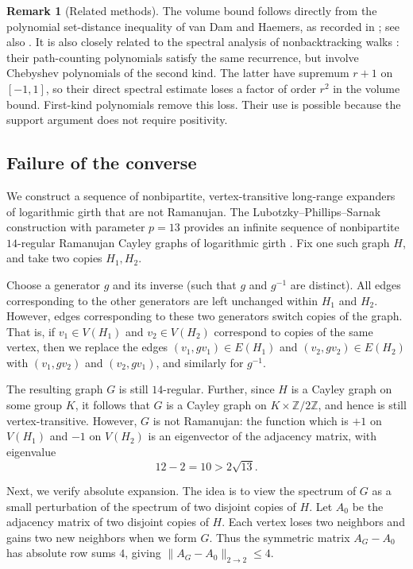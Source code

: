 \documentclass[11pt,reqno]{amsart}
\theoremstyle{definition}
\newtheorem{remark}[theorem]{Remark}
\begin{document}
\begin{remark}[Related methods]
The volume bound follows directly from the polynomial set-distance
inequality of van Dam and Haemers, as recorded in
\cite[Theorem~2.1]{vD98}; see also \cite{LPS,CFM}. It is also closely related to the spectral
analysis of nonbacktracking walks \cite{ABLS}: their
path-counting polynomials satisfy the same recurrence,
but involve Chebyshev polynomials of the second kind.
The latter have supremum $r+1$ on $[-1,1]$, so their direct
spectral estimate loses a factor of order $r^2$ in the
volume bound. First-kind polynomials remove this loss.
Their use is possible because the support argument does
not require positivity.
\end{remark}

\subsection{Failure of the converse}
We construct a sequence of nonbipartite, vertex-transitive
long-range expanders of logarithmic girth that are not Ramanujan.
The Lubotzky--Phillips--Sarnak construction with parameter $p=13$
provides an infinite sequence of nonbipartite $14$-regular Ramanujan
Cayley graphs of logarithmic girth \cite{LPS}.
Fix one such graph $H$, and take two copies $H_1,H_2$.

Choose a generator $g$ and its inverse (such that $g$ and $g^{-1}$ are distinct). All edges corresponding to the other generators are left unchanged within $H_1$ and $H_2$. However, edges corresponding to these two generators
switch copies of the graph. That is, if $v_1 \in V(H_1)$ and $v_2 \in V(H_2)$ correspond to copies of the same vertex, then we replace the edges $(v_1,gv_1 ) \in E(H_1)$ and $(v_2,gv_2) \in E(H_2)$ with $(v_1,gv_2)$ and $(v_2,gv_1)$, and similarly for $g^{-1}$. 

The resulting graph $G$ is still $14$-regular. Further, since $H$ is a
Cayley graph on some group $K$, it follows that $G$ is a Cayley graph on
$K\times\mathbb Z/2 \mathbb Z$, and hence is still vertex-transitive.
However, $G$ is not Ramanujan: the function which is $+1$ on $V(H_1)$ and $-1$ on $V(H_2)$ is an eigenvector of the adjacency matrix, with eigenvalue
\[
 12-2=10>2\sqrt{13}.
\]

Next, we verify absolute expansion. The idea is to view the spectrum of $G$ as a small perturbation of the spectrum of two disjoint copies of $H$. Let $A_0$ be the adjacency matrix of two disjoint copies of $H$. Each vertex loses two neighbors
and gains two new neighbors when we form $G$. Thus the symmetric
matrix $A_G-A_0$ has absolute row sums $4$, giving
$\|A_G-A_0\|_{2\to2}\le4$.
\end{document}
